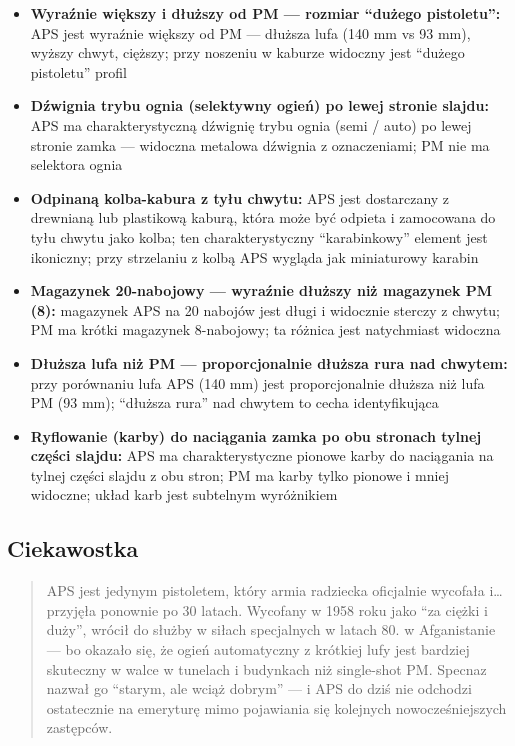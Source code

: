\documentclass[12pt,oneside]{book}
\providecommand{\tightlist}{%
  \setlength{\itemsep}{0pt}\setlength{\parskip}{0pt}}
\begin{document}
\begin{itemize}
\tightlist
\item
  \textbf{Wyraźnie większy i dłuższy od PM --- rozmiar ``dużego
  pistoletu'':} APS jest wyraźnie większy od PM --- dłuższa lufa (140 mm
  vs 93 mm), wyższy chwyt, cięższy; przy noszeniu w kaburze widoczny
  jest ``dużego pistoletu'' profil
\item
  \textbf{Dźwignia trybu ognia (selektywny ogień) po lewej stronie
  slajdu:} APS ma charakterystyczną dźwignię trybu ognia (semi / auto)
  po lewej stronie zamka --- widoczna metalowa dźwignia z oznaczeniami;
  PM nie ma selektora ognia
\item
  \textbf{Odpinaną kolba-kabura z tyłu chwytu:} APS jest dostarczany z
  drewnianą lub plastikową kaburą, która może być odpieta i zamocowana
  do tyłu chwytu jako kolba; ten charakterystyczny ``karabinkowy''
  element jest ikoniczny; przy strzelaniu z kolbą APS wygląda jak
  miniaturowy karabin
\item
  \textbf{Magazynek 20-nabojowy --- wyraźnie dłuższy niż magazynek PM
  (8):} magazynek APS na 20 nabojów jest długi i widocznie sterczy z
  chwytu; PM ma krótki magazynek 8-nabojowy; ta różnica jest natychmiast
  widoczna
\item
  \textbf{Dłuższa lufa niż PM --- proporcjonalnie dłuższa rura nad
  chwytem:} przy porównaniu lufa APS (140 mm) jest proporcjonalnie
  dłuższa niż lufa PM (93 mm); ``dłuższa rura'' nad chwytem to cecha
  identyfikująca
\item
  \textbf{Ryflowanie (karby) do naciągania zamka po obu stronach tylnej
  części slajdu:} APS ma charakterystyczne pionowe karby do naciągania
  na tylnej części slajdu z obu stron; PM ma karby tylko pionowe i mniej
  widoczne; układ karb jest subtelnym wyróżnikiem
\end{itemize}

\subsection{Ciekawostka}\label{ciekawostka-103}

\begin{quote}
APS jest jedynym pistoletem, który armia radziecka oficjalnie wycofała
i\ldots{} przyjęła ponownie po 30 latach. Wycofany w 1958 roku jako ``za
ciężki i duży'', wrócił do służby w siłach specjalnych w latach 80. w
Afganistanie --- bo okazało się, że ogień automatyczny z krótkiej lufy
jest bardziej skuteczny w walce w tunelach i budynkach niż single-shot
PM. Specnaz nazwał go ``starym, ale wciąż dobrym'' --- i APS do dziś nie
odchodzi ostatecznie na emeryturę mimo pojawiania się kolejnych
nowocześniejszych zastępców.
\end{quote}
\end{document}
